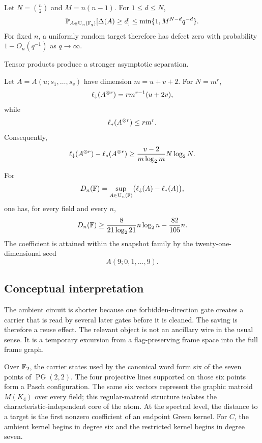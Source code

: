 \begin{corollary}\label{cor:finite-field-sparsity-intro}
Let $N=\binom n2$ and $M=n(n-1)$.  For $1\le d\le N$,
\[
\mathbb P_{A\in\operatorname{U}_n(\mathbb F_q)}[\Delta(A)\ge d]
\le
\min\{1,M^{N-d}q^{-d}\}.
\]
For fixed $n$, a uniformly random target therefore has defect zero with probability $1-O_n(q^{-1})$ as $q\to\infty$.
\end{corollary}

Tensor products produce a stronger asymptotic separation.

\begin{theorem}\label{thm:tensor-main}
Let $A=A(u;s_1,\ldots,s_v)$ have dimension $m=u+v+2$.  For $N=m^r$,
\[
\ell_{\downarrow}(A^{\otimes r})
=r m^{r-1}(u+2v),
\]
while
\[
\ell_{*}(A^{\otimes r})
\le r m^r.
\]
Consequently,
\[
\ell_{\downarrow}(A^{\otimes r})-\ell_{*}(A^{\otimes r})
\ge
\frac{v-2}{m\log_2m}N\log_2N.
\]
\end{theorem}

\begin{corollary}\label{cor:nlogn-gap}
For
\[
D_n(\mathbb F)
=
\sup_{A\in\operatorname{U}_n(\mathbb F)}
\bigl(\ell_{\downarrow}(A)-\ell_{*}(A)\bigr),
\]
one has, for every field and every $n$,
\[
D_n(\mathbb F)
\ge
\frac{8}{21\log_2 21}n\log_2n
-
\frac{82}{105}n.
\]
The coefficient is attained within the snapshot family by the twenty-one-dimensional seed
\[
A(9;0,1,\ldots,9).
\]
\end{corollary}

\subsection*{Conceptual interpretation}

The ambient circuit is shorter because one forbidden-direction gate creates a carrier that is read by several later gates before it is cleaned.  The saving is therefore a reuse effect.  The relevant object is not an ancillary wire in the usual sense.  It is a temporary excursion from a flag-preserving frame space into the full frame graph.

Over $\mathbb F_2$, the carrier states used by the canonical word form six of the seven points of $\operatorname{PG}(2,2)$.  The four projective lines supported on those six points form a Pasch configuration.  The same six vectors represent the graphic matroid $M(K_4)$ over every field; this regular-matroid structure isolates the characteristic-independent core of the atom.  At the spectral level, the distance to a target is the first nonzero coefficient of an endpoint Green kernel.  For $C$, the ambient kernel begins in degree six and the restricted kernel begins in degree seven.

